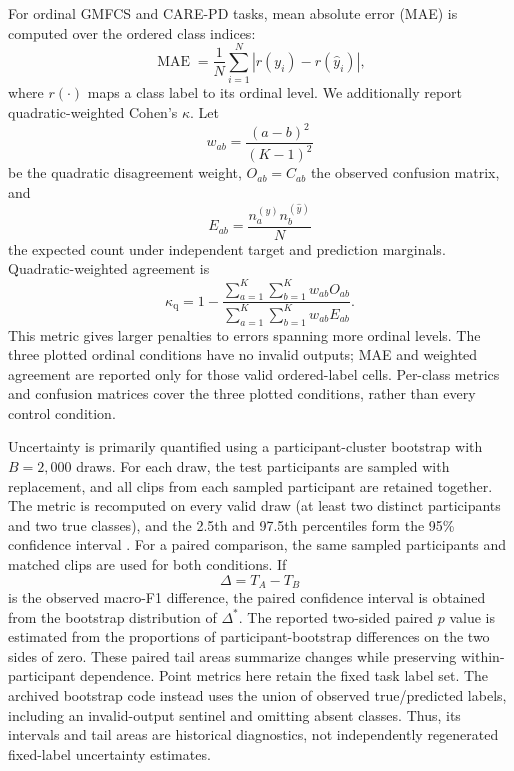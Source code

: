 For ordinal GMFCS and CARE-PD tasks, mean absolute error (MAE) is
computed over the ordered class indices:
\begin{equation}
\operatorname{MAE}
    =\frac{1}{N}\sum_{i=1}^{N}
       \left|r(y_i)-r(\hat y_i)\right|,
\end{equation}
where $r(\cdot)$ maps a class label to its ordinal level. We additionally
report quadratic-weighted Cohen's $\kappa$. Let
\begin{equation}
w_{ab}=\frac{(a-b)^2}{(K-1)^2}
\end{equation}
be the quadratic disagreement weight, $O_{ab}=C_{ab}$ the observed
confusion matrix, and
\begin{equation}
E_{ab}=\frac{n_a^{(y)}n_b^{(\hat y)}}{N}
\end{equation}
the expected count under independent target and prediction marginals.
Quadratic-weighted agreement is
\begin{equation}
\kappa_{\mathrm{q}}
    =1-\frac{\sum_{a=1}^{K}\sum_{b=1}^{K}w_{ab}O_{ab}}
             {\sum_{a=1}^{K}\sum_{b=1}^{K}w_{ab}E_{ab}}.
\end{equation}
This metric gives larger penalties to errors spanning more ordinal
levels. The three plotted ordinal conditions have no invalid outputs; MAE and weighted agreement are reported only for those valid ordered-label cells. Per-class metrics and confusion matrices cover the three plotted conditions, rather than every control condition.

Uncertainty is primarily quantified using a participant-cluster
bootstrap with $B=2{,}000$ draws. For each draw, the test participants
are sampled with replacement, and all clips from each sampled
participant are retained together. The metric is recomputed on every
valid draw (at least two distinct participants and two true classes), and the 2.5th and 97.5th percentiles form the 95\%
confidence interval \cite{efron1993bootstrap}. For a paired comparison,
the same sampled participants and matched clips are used for both
conditions. If
\begin{equation}
\Delta=T_A-T_B
\end{equation}
is the observed macro-F1 difference, the paired confidence interval is
obtained from the bootstrap distribution of $\Delta^{*}$. The reported
two-sided paired $p$ value is estimated from the proportions of
participant-bootstrap differences on the two sides of zero. These
paired tail areas summarize changes while preserving within-participant dependence. Point metrics here retain the fixed task label set. The archived bootstrap code instead uses the union of observed true/predicted labels, including an invalid-output sentinel and omitting absent classes. Thus, its intervals and tail areas are historical diagnostics, not independently regenerated fixed-label uncertainty estimates.

